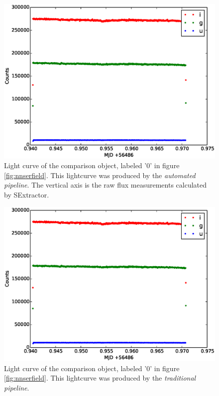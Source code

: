 \begin{figure}[!h]
\centering
\includegraphics[width=140mm]{images/comparison_auto.eps}
\caption{Light curve of the comparison object, labeled '0' in figure \ref{fig:nnserfield}. This lightcurve was produced by the \emph{automated pipeline}. The vertical axis is the raw flux measurements calculated by SExtractor.  }
\label{fig:nnsercomparisonauto}
\end{figure}

\begin{figure}[!h]
\centering
\includegraphics[width=140mm]{images/comparison_auto.eps}
\caption{Light curve of the comparison object, labeled '0' in figure \ref{fig:nnserfield}. This lightcurve was produced by the \emph{traditional pipeline}. }
\label{fig:nnsercomparisontom}
\end{figure}

